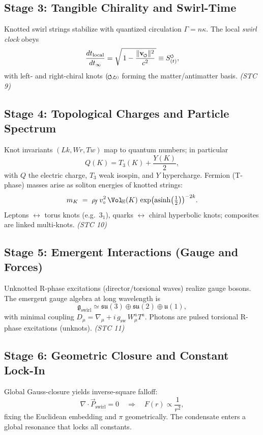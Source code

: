 \documentclass[reprint,aps,onecolumn,nofootinbib]{revtex4-2}
\newcommand{\swirlarrow}{%
    \mathchoice{\mkern-2mu\scriptstyle\boldsymbol{\circlearrowleft}}%
    {\mkern-2mu\scriptstyle\boldsymbol{\circlearrowleft}}%
    {\mkern-2mu\scriptscriptstyle\boldsymbol{\circlearrowleft}}%
    {\mkern-2mu\scriptscriptstyle\boldsymbol{\circlearrowleft}}%
}
\newcommand{\swirlarrowcw}{%
    \mathchoice{\mkern-2mu\scriptstyle\boldsymbol{\circlearrowright}}%
    {\mkern-2mu\scriptstyle\boldsymbol{\circlearrowright}}%
    {\mkern-2mu\scriptscriptstyle\boldsymbol{\circlearrowright}}%
    {\mkern-2mu\scriptscriptstyle\boldsymbol{\circlearrowright}}%
}
\newcommand{\vswirl}{\mathbf{v}_{\swirlarrow}}
\newcommand{\SwirlClock}{S_{(t)}^{\swirlarrow}}
\newcommand{\rhof}{\rho_{\!f}}                           %
\newcommand{\xig}{\operatorname{asinh}\!\left(\tfrac{1}{2}\right)}
\newcommand{\phig}{\exp(\xig)}
\begin{document}
	\subsection*{Stage 3: Tangible Chirality and Swirl-Time}
	Knotted swirl strings stabilize with quantized circulation $\Gamma=n\kappa$.
	The local \emph{swirl clock} obeys
	\[
		\frac{dt_{\text{local}}}{dt_{\infty}}= \sqrt{\,1-\frac{\|\vswirl\|^2}{c^2}\,}\equiv \SwirlClock,
	\]
	with left- and right-chiral knots $(\swirlarrow,\swirlarrowcw)$ forming the matter/antimatter basis. \emph{(STC 9)}

	\subsection*{Stage 4: Topological Charges and Particle Spectrum}
	Knot invariants $(Lk,Wr,Tw)$ map to quantum numbers; in particular
	\[
		Q(K)=T_3(K)+\frac{Y(K)}{2},
	\]
	with $Q$ the electric charge, $T_3$ weak isospin, and $Y$ hypercharge.
	Fermion (T-phase) masses arise as soliton energies of knotted strings:
	\[
		m_{K} \;=\; \rhof\, v_{\circ}^{2}\,\Vol_{\!\mathbb{H}}(K)\,\phig^{-2k}.
	\]
	Leptons $\leftrightarrow$ torus knots (e.g.\ $3_1$), quarks $\leftrightarrow$ chiral hyperbolic knots; composites are linked multi-knots. \emph{(STC 10)}

	\subsection*{Stage 5: Emergent Interactions (Gauge and Forces)}
	Unknotted R-phase excitations (director/torsional waves) realize gauge bosons.
	The emergent gauge algebra at long wavelength is
	\[
		\mathfrak{g}_{\text{swirl}}\simeq \mathfrak{su}(3)\oplus \mathfrak{su}(2)\oplus \mathfrak{u}(1),
	\]
	with minimal coupling $D_\mu=\nabla_\mu + i\,g_{\text{sw}}\,W^a_{\mu}T^a$. Photons are pulsed torsional R-phase excitations (unknots). \emph{(STC 11)}

	\subsection*{Stage 6: Geometric Closure and Constant Lock-In}
	Global Gauss-closure yields inverse-square falloff:
	\[
		\nabla\!\cdot\!\vec{P}_{\text{swirl}}=0 \quad\Rightarrow\quad F(r)\propto \frac{1}{r^2},
	\]
	fixing the Euclidean embedding and $\pi$ geometrically. The condensate enters a global resonance that locks all constants.
\end{document}
